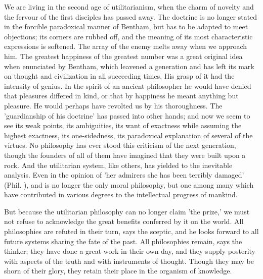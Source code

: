 \documentclass[11pt,letter]{article}
\begin{document}
\par  We are living in the second age of utilitarianism, when the charm of novelty and the fervour of the first disciples has passed away. The doctrine is no longer stated in the forcible paradoxical manner of Bentham, but has to be adapted to meet objections; its corners are rubbed off, and the meaning of its most characteristic expressions is softened. The array of the enemy melts away when we approach him. The greatest happiness of the greatest number was a great original idea when enunciated by Bentham, which leavened a generation and has left its mark on thought and civilization in all succeeding times. His grasp of it had the intensity of genius. In the spirit of an ancient philosopher he would have denied that pleasures differed in kind, or that by happiness he meant anything but pleasure. He would perhaps have revolted us by his thoroughness. The 'guardianship of his doctrine' has passed into other hands; and now we seem to see its weak points, its ambiguities, its want of exactness while assuming the highest exactness, its one-sidedness, its paradoxical explanation of several of the virtues. No philosophy has ever stood this criticism of the next generation, though the founders of all of them have imagined that they were built upon a rock. And the utilitarian system, like others, has yielded to the inevitable analysis. Even in the opinion of 'her admirers she has been terribly damaged' (Phil. ), and is no longer the only moral philosophy, but one among many which have contributed in various degrees to the intellectual progress of mankind.

\par  But because the utilitarian philosophy can no longer claim 'the prize,' we must not refuse to acknowledge the great benefits conferred by it on the world. All philosophies are refuted in their turn, says the sceptic, and he looks forward to all future systems sharing the fate of the past. All philosophies remain, says the thinker; they have done a great work in their own day, and they supply posterity with aspects of the truth and with instruments of thought. Though they may be shorn of their glory, they retain their place in the organism of knowledge.
\end{document}
